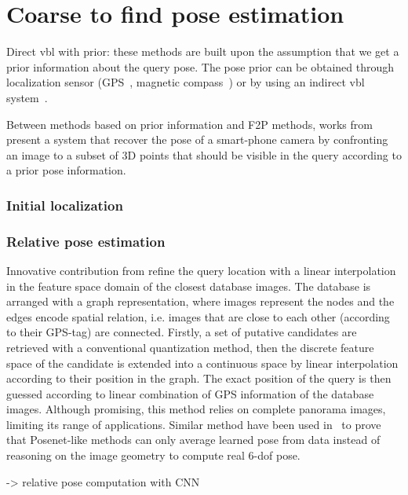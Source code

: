 \section{Coarse to find pose estimation}


Direct \ac{vbl} with prior: these methods are built upon the assumption that we get a prior information about the query pose. The pose prior can be obtained through localization sensor (GPS~\citep{Chen2011,Arth2015,Poglitsch2015}, magnetic compass~\citep{Svarm2014,Zeisl2015,Svarm2016}) or by using an indirect \ac{vbl} system~\citep{Torii2011,Song2016,Sattler2017}.

Between methods based on prior information and F2P methods, works from \citet{Arth2009} present a system that recover the pose of a smart-phone camera by confronting an image to a subset of 3D points that should be visible in the query according to a prior pose information.

\subsubsection{Initial localization}

\subsubsection{Relative pose estimation}

Innovative contribution from \citet{Torii2011} refine the query location with a linear interpolation in the feature space domain of the closest database images. The database is arranged with a graph representation, where images represent the nodes and the edges encode spatial relation, i.e. images that are close to each other (according to their GPS-tag) are connected. Firstly, a set of putative candidates are retrieved with a conventional quantization method, then the discrete feature space of the candidate is extended into a continuous space by linear interpolation according to their position in the graph. The exact position of the query is then guessed according to linear combination of GPS information of the database images. Although promising, this method relies on complete panorama images, limiting its range of applications. Similar method have been used in~\citep{Sattler2019} to prove that Posenet-like methods can only average learned pose from data instead of reasoning on the image geometry to compute real 6-\ac{dof} pose.

\citep{Li2019} -> relative pose computation with CNN

